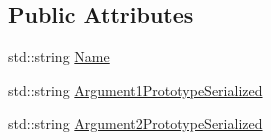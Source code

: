 \subsection*{Public Attributes}
\begin{DoxyCompactItemize}
\item 
std\-::string \hyperlink{classmts_command_qualified_read_description_a9baf176ea04ec6aef288cffbe6fe2c2e}{Name}
\item 
std\-::string \hyperlink{classmts_command_qualified_read_description_a3942c33fb00289e328d0b97990e0cadc}{Argument1\-Prototype\-Serialized}
\item 
std\-::string \hyperlink{classmts_command_qualified_read_description_a2695768201660f751e69e3852bb20a6b}{Argument2\-Prototype\-Serialized}
\end{DoxyCompactItemize}



